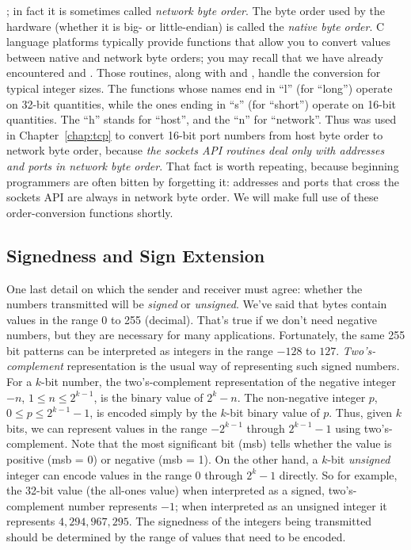 ;
in fact it is sometimes called \emph{network byte order}.
The byte order used by the hardware (whether it is big- or
little-endian) is called the \emph{native byte order}.
C language platforms typically provide functions that allow you to
convert values between native and network byte orders; you may recall
that we have already encountered  and
.
Those routines, along with  and ,
handle the conversion for typical integer sizes.
The functions whose names end in ``l''
(for ``long'') operate on 32-bit quantities, while the ones ending in
``s'' (for ``short'') operate on 16-bit quantities.  The ``h'' stands
for ``host'', and the ``n'' for ``network''.  Thus 
was used in Chapter~\ref{chap:tcp} to convert 16-bit port
numbers from host byte order to network byte order, because \emph{the
sockets API routines deal only with addresses and ports in
  network byte order}.  That fact is worth repeating, because beginning
programmers are often bitten by forgetting it:  addresses and ports
that cross the sockets API are always in network byte order.
We will make full use of these order-conversion functions shortly.

\subsection{Signedness and Sign Extension}

One last detail on which the sender and receiver must agree: whether
the numbers transmitted will be \emph{signed\/} or \emph{unsigned}.
We've said that bytes contain values in the range 0 to 255
(decimal). That's true if we don't need negative numbers, but they are
necessary for many applications.  Fortunately, the same 255 bit
patterns can be interpreted as integers in the range $-128$ to $127$.
\emph{Two's-complement} representation is the
usual way of representing such signed numbers.
For a $k$-bit number, the two's-complement representation of
the negative integer $-n$, $1 \leq n \leq 2^{k-1}$,
is the binary value of $2^k - n$.  The non-negative integer $p$,
$0 \leq p \leq 2^{k-1}-1$, is encoded simply by
the $k$-bit binary value of $p$.  Thus, given $k$ bits,
we can represent values in the range $-2^{k-1}$ through $2^{k-1}-1$
using two's-complement.  Note that the
most significant bit (msb) tells whether the value is positive (msb = 0)
or negative (msb = 1).
%
On the other hand, a $k$-bit \emph{unsigned} integer can encode values
in the range 0 through $2^k-1$ directly.
So for example, the 32-bit value  (the all-ones
value) when interpreted as a signed, two's-complement number
represents $-1$; when interpreted as an unsigned integer it
represents $4,294,967,295$.
The signedness of the integers being transmitted should be determined
by the range of values that need to be encoded.

